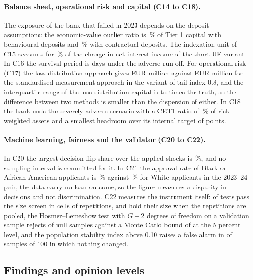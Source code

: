 \paragraph{Balance sheet, operational risk and capital (C14 to C18).}
The exposure of the bank that failed in 2023 depends on the deposit assumptions: the economic-value outlier ratio is \rsCFourteenBeh{}\,\% of Tier 1 capital with behavioural deposits and \rsCFourteenCon{}\,\% with contractual deposits. The indexation unit of C15 accounts for \pxSevenShare{}\,\% of the change in net interest income of the short-UF variant. In C16 the survival period is \almAcceptSurvivalAdv{} days under the adverse run-off. For operational risk (C17) the loss distribution approach gives EUR \rsCSeventeenLda{} million against EUR \rsCSeventeenSma{} million for the standardised measurement approach in the variant of tail index 0.8, and the interquartile range of the loss-distribution capital is \pxTwelveIqrMin{} to \pxTwelveIqrMax{} times the truth, so the difference between two methods is smaller than the dispersion of either. In C18 the bank ends the severely adverse scenario with a CET1 ratio of \rsCEighteenCet{}\,\% of risk-weighted assets and a smallest headroom over its internal target of \rsCEighteenHead{} points.

\paragraph{Machine learning, fairness and the validator (C20 to C22).} In C20 the largest decision-flip share over the applied shocks is \rsCTwentyFlip{}\,\%, and no sampling interval is committed for it. In C21 the approval rate of Black or African American applicants is \rsCTwentyOneBlack{}\,\% against \rsCTwentyOneWhite{}\,\% for White applicants in the 2023--24 pair; the data carry no loan outcome, so the figure measures a disparity in decisions and not discrimination. C22 measures the instrument itself: \rsCTwentyTwoWithin{} of \pxOneTests{} tests pass the size screen in cells of \rsCTwentyTwoNullPerTest{} repetitions, and \pxPpOneHold{} hold their size when the repetitions are pooled, the Hosmer--Lemeshow test with $G-2$ degrees of freedom on a validation sample rejects \rsCTwentyTwoHl{} of null samples against a Monte Carlo bound of \rsCTwentyTwoBound{} at the 5 percent level, and the population stability index above 0.10 raises a false alarm in \rsCTwentyTwoPsi{} of samples of 100 in which nothing changed.

\subsection{Findings and opinion levels}
\label{sec:results-findings}

